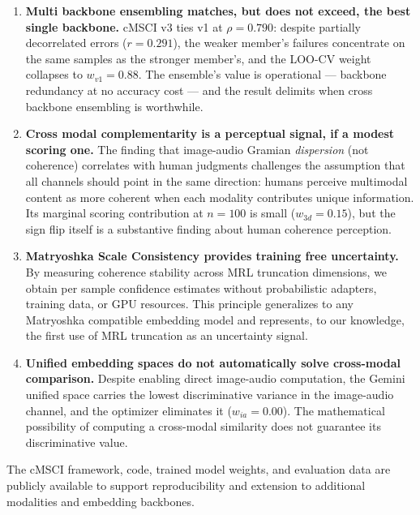 \documentclass[a4paper,fleqn]{cas-sc}
\begin{document}
\begin{itemize}
\begin{enumerate}
\item \textbf{Multi backbone ensembling matches, but does not exceed, the best single backbone.} cMSCI v3 ties v1 at $\rho = 0.790$: despite partially decorrelated errors ($r = 0.291$), the weaker member's failures concentrate on the same samples as the stronger member's, and the LOO-CV weight collapses to $w_{v1} = 0.88$. The ensemble's value is operational — backbone redundancy at no accuracy cost — and the result delimits when cross backbone ensembling is worthwhile.

\item \textbf{Cross modal complementarity is a perceptual signal, if a modest scoring one.} The finding that image-audio Gramian \emph{dispersion} (not coherence) correlates with human judgments challenges the assumption that all channels should point in the same direction: humans perceive multimodal content as more coherent when each modality contributes unique information. Its marginal scoring contribution at $n = 100$ is small ($w_{3d} = 0.15$), but the sign flip itself is a substantive finding about human coherence perception.

\item \textbf{Matryoshka Scale Consistency provides training free uncertainty.} By measuring coherence stability across MRL truncation dimensions, we obtain per sample confidence estimates without probabilistic adapters, training data, or GPU resources. This principle generalizes to any Matryoshka compatible embedding model and represents, to our knowledge, the first use of MRL truncation as an uncertainty signal.

\item \textbf{Unified embedding spaces do not automatically solve cross-modal comparison.} Despite enabling direct image-audio computation, the Gemini unified space carries the lowest discriminative variance in the image-audio channel, and the optimizer eliminates it ($w_{ia} = 0.00$). The mathematical possibility of computing a cross-modal similarity does not guarantee its discriminative value.
\end{enumerate}

The cMSCI framework, code, trained model weights, and evaluation data are publicly available to support reproducibility and extension to additional modalities and embedding backbones.




\end{itemize}
\end{document}
